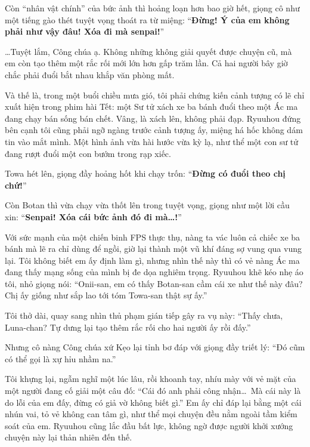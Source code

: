 \documentclass[../main.tex]{subfiles}
\begin{document}
Còn ``nhân vật chính'' của bức ảnh thì hoảng loạn hơn bao giờ hết, giọng cô như một tiếng gào thét tuyệt vọng thoát ra từ miệng: ``\textbf{Đừng! Ý của em không phải như vậy đâu! Xóa đi mà senpai!}''

\dots Tuyệt lắm, Công chúa ạ. Không những không giải quyết được chuyện cũ, mà em còn tạo thêm một rắc rối mới lớn hơn gấp trăm lần. Cả hai người bây giờ chắc phải đuổi bắt nhau khắp văn phòng mất.

\omk

Và thế là, trong một buổi chiều mưa gió, tôi phải chứng kiến cảnh tượng có lẽ chỉ xuất hiện trong phim hài Tết: một Sư tử xách xe ba bánh đuổi theo một Ác ma đang chạy bán sống bán chết. Vâng, là xách lên, không phải đạp. Ryuuhou đứng bên cạnh tôi cũng phải ngỡ ngàng trước cảnh tượng ấy, miệng há hốc không dám tin vào mắt mình. Một hình ảnh vừa hài hước vừa kỳ lạ, như thể một con sư tử đang rượt đuổi một con bướm trong rạp xiếc.


Towa hét lên, giọng đầy hoảng hốt khi chạy trốn: ``\textbf{Đừng có đuổi theo chị chứ!}''

Còn Botan thì vừa chạy vừa thốt lên trong tuyệt vọng, giọng như một lời cầu xin: ``\textbf{Senpai! Xóa cái bức ảnh đó đi mà\dots!}''

Với sức mạnh của một chiến binh FPS thực thụ, nàng ta vác luôn cả chiếc xe ba bánh mà lẽ ra chỉ dùng để ngồi, giờ lại thành một vũ khí đáng sợ vung qua vung lại. Tôi không biết em ấy định làm gì, nhưng nhìn thế này thì có vẻ nàng Ác ma đang thấy mạng sống của mình bị đe dọa nghiêm trọng. Ryuuhou khẽ kéo nhẹ áo tôi, nhỏ giọng nói: ``Onii-san, em có thấy Botan-san cầm cái xe như thế này đâu? Chị ấy giống như sắp lao tới tóm Towa-san thật sự ấy.''

Tôi thở dài, quay sang nhìn thủ phạm gián tiếp gây ra vụ này: ``Thấy chưa, Luna-chan? Tự dưng lại tạo thêm rắc rối cho hai người ấy rồi đấy.''

Nhưng cô nàng Công chúa xứ Kẹo lại tỉnh bơ đáp với giọng đầy triết lý: ``Đó cũm có thể gọi là xự hỉu nhầm na.''

Tôi khựng lại, ngẫm nghĩ một lúc lâu, rồi khoanh tay, nhíu mày với vẻ mặt của một người đang cố giải một câu đố: ``Cái đó anh phải công nhận\dots\ Mà cái này là do lỗi của em đấy, đừng có giả vờ không biết gì.'' Em ấy chỉ đáp lại bằng một cái nhún vai, tỏ vẻ không can tâm gì, như thể mọi chuyện đều nằm ngoài tầm kiểm soát của em. Ryuuhou cũng lắc đầu bất lực, không ngờ được người khởi xướng chuyện này lại thản nhiên đến thế.
\end{document}
